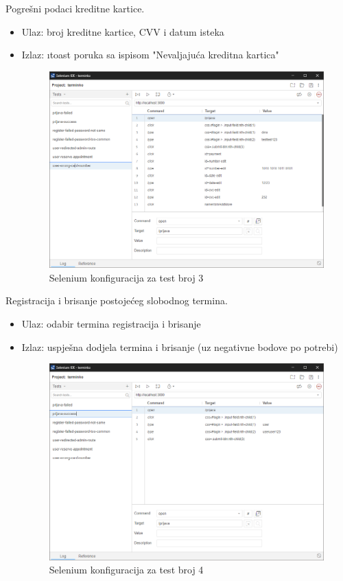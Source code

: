 \begin{packed_enum}
	 		\item Pogrešni podaci kreditne kartice.
	 		\begin{itemize}
	 			\item Ulaz: broj kreditne kartice, CVV i datum isteka
	 			\item Izlaz: \i{toast} poruka sa ispisom "Nevaljajuća kreditna kartica"
	 			\begin{figure}[H]
	 				\includegraphics[width=0.95\linewidth]{slike/test2.png}
	 				\centering
	 				\caption{Selenium konfiguracija za test broj 3}
	 				\label{fig:dijagram_razmjestaja}
	 			\end{figure}
	 		\end{itemize}
 			\eject
			 	
			 	\item Registracija i brisanje postojećeg slobodnog termina.
			 	\begin{itemize}
			 		\item Ulaz: odabir termina registracija i brisanje
			 		\item Izlaz: uspješna dodjela termina i brisanje (uz negativne bodove po potrebi)
			 		\begin{figure}[H]
			 			\includegraphics[width=0.95\linewidth]{slike/test0.png}
			 			\centering
			 			\caption{Selenium konfiguracija za test broj 4}
			 			\label{fig:dijagram_razmjestaja}
			 		\end{figure}
			 	\end{itemize}
			 \end{packed_enum}
		 	 \eject
		
